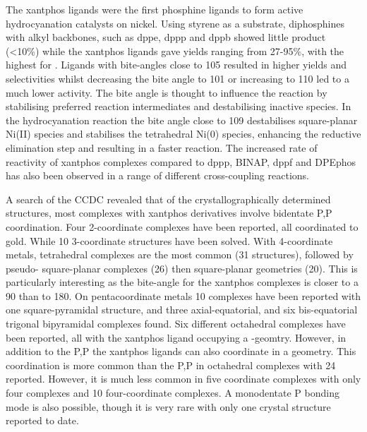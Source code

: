 The xantphos ligands were the first phosphine ligands to form active hydrocyanation catalysts on nickel.\cite{Kranenburg1995b}  Using styrene as a substrate, diphosphines with alkyl backbones, such as \gls{dppe}, \gls{dppp} and \gls{dppb} showed little product (<10\%) while the xantphos ligands gave yields ranging from 27-95\%, with the highest for \Phsixantphos{}.  Ligands with bite-angles close to 105\degrees{} resulted in higher yields and selectivities whilst decreasing the bite angle to 101\degrees{} or increasing to 110\degrees{} led to a much lower activity.  The bite angle is thought to influence the reaction by stabilising preferred reaction intermediates and destabilising inactive species.   In the hydrocyanation reaction the bite angle close to 109\degrees{} destabilises square-planar Ni(II) species and stabilises the tetrahedral Ni(0) species, enhancing the reductive elimination step and resulting in a faster reaction.\cite{Goertz1998}  The increased rate of reactivity of xantphos complexes compared to \gls{dppp}, \gls{BINAP}, \gls{dppf} and \gls{DPEphos} has also been observed in a range of different cross-coupling reactions.\cite{Birkholz2009}

A search of the \gls{CCDC} revealed that of the crystallographically determined structures, most complexes with xantphos derivatives involve bidentate \dento{}P,P\textprime{} coordination.  Four 2-coordinate complexes have been reported, all coordinated to gold.  While 10 3-coordinate structures have been solved.  With 4-coordinate metals, tetrahedral complexes are the most common (31 structures), followed by pseudo-\trans{} square-planar complexes (26) then \cis{} square-planar geometries (20).  This is particularly interesting as the bite-angle for the xantphos complexes is closer to a 90\degrees{} than to 180\degrees.  On pentacoordinate metals 10 complexes have been reported with one square-pyramidal structure, and three axial-equatorial, and six bis-equatorial trigonal bipyramidal complexes found.  Six different octahedral complexes have been reported, all with the xantphos ligand occupying a \cis{}-geomtry.  However, in addition to the \dento{}P,P\textprime{} the xantphos ligands can also coordinate in a \POP{} geometry.  This \POP{} coordination is more common than the \dento{}P,P\textprime{} in octahedral complexes with 24 reported.  However, it is much less common in five coordinate complexes with only four \POP{} complexes and 10 \POP{} four-coordinate complexes.  A monodentate \dento{}P bonding mode is also possible, though it is very rare with only one crystal structure reported to date.\cite{Escalle2009}

